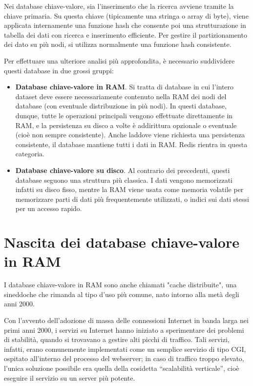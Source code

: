 Nei database chiave-valore, sia l'inserimento che la ricerca avviene tramite
la chiave primaria. Su questa chiave (tipicamente una stringa o array di byte),
viene applicata internamente una funzione hash che consente poi una strutturazione
in tabella dei dati con ricerca e inserimento efficiente. Per gestire il partizionamento
dei dato su più nodi, si utilizza normalmente una funzione hash consistente.

Per effettuare una ulteriore analisi più approfondita, è necessario suddividere
questi database in due grossi gruppi:

\begin{itemize}
	\medskip
	\item
	\textbf{Database chiave-valore in RAM}. Si tratta di database in cui l'intero dataset
	deve essere necessariamente contenuto nella RAM dei nodi del database
	(con eventuale distribuzione in più nodi). In questi database, dunque, tutte
	le operazioni principali vengono effettuate direttamente in RAM, e la persistenza
	su disco a volte è addirittura opzionale o eventuale (cioè non sempre consistente).
	Anche laddove viene richiesta una persistenza consistente, il database mantiene
	tutti i dati in RAM. Redis rientra in questa categoria.

	\item
	\textbf{Database chiave-valore su disco}. Al contrario dei precedenti, questi
	database seguono una struttura più classica. I dati vengono memorizzati infatti
	su disco fisso, mentre la RAM viene usata come memoria volatile per memorizzare
	parti di dati più frequentemente utilizzati, o indici sui dati stessi per un
	accesso rapido.
\end{itemize}

\section{Nascita dei database chiave-valore in RAM}

I database chiave-valore in RAM sono anche chiamati "cache distribuite", una sineddoche
che rimanda al tipo d'uso più comune, nato intorno alla metà degli anni 2000.

Con l'avvento dell'adozione di massa delle connessioni Internet in banda larga nei primi
anni 2000, i servizi su Internet hanno iniziato a sperimentare dei problemi di stabilità,
quando si trovavano a gestire alti picchi di traffico. Tali servizi, infatti, erano
comunemente implementati come un semplice servizio di tipo CGI, ospitato all'interno
del processo del webserver; in caso di traffico troppo elevato, l'unica soluzione possibile
era quella della cosidetta ``scalabilità verticale'', cioè eseguire il servizio su un
server più potente.

